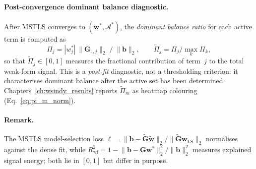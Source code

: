 \paragraph{Post-convergence dominant balance diagnostic.}
After MSTLS converges to $(\mathbf{w}^*,\mathcal{A}^*)$, the
\emph{dominant balance ratio} for each active term is computed as
\begin{equation}
  \Pi_j = |w_j^*|\,\lVert\mathbf{G}_{:,j}\rVert_2 \;/\; \lVert\mathbf{b}\rVert_2,
  \qquad
  \tilde\Pi_j = \Pi_j / \max_k \Pi_k,
  \label{eq:pi_j_diagnostic}
\end{equation}
so that $\tilde\Pi_j\in[0,1]$ measures the fractional contribution of
term~$j$ to the total weak-form signal.  This is a \emph{post-fit}
diagnostic, not a thresholding criterion: it characterises dominant balance
after the active set has been determined.  Chapters~\ref{ch:wsindy_results}
reports $\tilde\Pi_m$ as heatmap colouring (Eq.~\eqref{eq:pi_m_norm}).

\paragraph{Remark.}
The MSTLS model-selection loss
$\ell = \lVert\mathbf{b}-\tilde{\mathbf{G}}\tilde{\mathbf{w}}\rVert_2
        / \lVert\tilde{\mathbf{G}}\mathbf{w}_{\mathrm{LS}}\rVert_2$
normalises against the dense fit, while
$R^2_{\mathrm{wf}} = 1 - \lVert\mathbf{b}-\mathbf{G}\mathbf{w}^*\rVert_2^2
                        / \lVert\mathbf{b}\rVert_2^2$
measures explained signal energy; both lie in $[0,1]$ but differ in
purpose.

